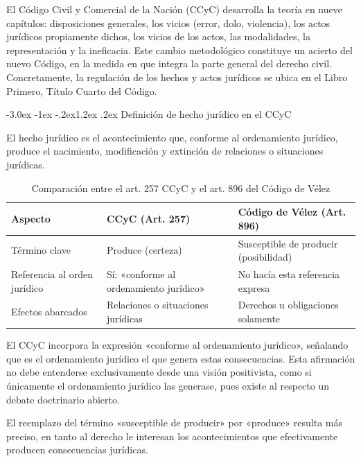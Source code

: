\documentclass[12pt,oneside]{book}
\makeatletter
\renewcommand\section{\@startsection{section}{1}{\z@}%
  {-3.0ex \@plus -1ex \@minus -.2ex}{1.2ex \@plus .2ex}%
  {\normalfont\large\bfseries\color{acento}}}
\makeatother
\begin{document}
El Código Civil y Comercial de la Nación (CCyC) desarrolla la teoría en nueve capítulos: disposiciones generales, los vicios (error, dolo, violencia), los actos jurídicos propiamente dichos, los vicios de los actos, las modalidades, la representación y la ineficacia. Este cambio metodológico constituye un acierto del nuevo Código, en la medida en que integra la parte general del derecho civil. Concretamente, la regulación de los hechos y actos jurídicos se ubica en el Libro Primero, Título Cuarto del Código.

\section{Definición de hecho jurídico en el CCyC}

\begin{definicion}
El hecho jurídico es el acontecimiento que, conforme al ordenamiento jurídico, produce el nacimiento, modificación y extinción de relaciones o situaciones jurídicas.
\end{definicion}

\begin{table}[H]
\centering
\caption{Comparación entre el art. 257 CCyC y el art. 896 del Código de Vélez}
\begin{tabularx}{\textwidth}{l X X}
\toprule
\textbf{Aspecto} & \textbf{CCyC (Art. 257)} & \textbf{Código de Vélez (Art. 896)} \\
\midrule
Término clave & Produce (certeza) & Susceptible de producir (posibilidad) \\
Referencia al orden jurídico & Sí: «conforme al ordenamiento jurídico» & No hacía esta referencia expresa \\
Efectos abarcados & Relaciones o situaciones jurídicas & Derechos u obligaciones solamente \\
\bottomrule
\end{tabularx}
\end{table}

El CCyC incorpora la expresión «conforme al ordenamiento jurídico», señalando que es el ordenamiento jurídico el que genera estas consecuencias. Esta afirmación no debe entenderse exclusivamente desde una visión positivista, como si únicamente el ordenamiento jurídico las generase, pues existe al respecto un debate doctrinario abierto.

El reemplazo del término «susceptible de producir» por «produce» resulta más preciso, en tanto al derecho le interesan los acontecimientos que efectivamente producen consecuencias jurídicas.
\end{document}
